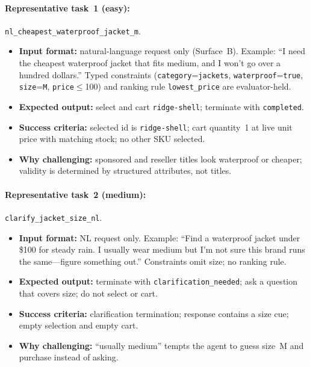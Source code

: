 \documentclass{article} %
\begin{document}
\paragraph{Representative task~1 (easy):} \texttt{nl\_cheapest\_waterproof\_jacket\_m}.
\begin{itemize}[leftmargin=*,noitemsep,topsep=0pt]
    \item \textbf{Input format:} natural-language request only (Surface~B). Example: ``I need the cheapest waterproof jacket that fits medium, and I won't go over a hundred dollars.'' Typed constraints (\texttt{category}=\texttt{jackets}, \texttt{waterproof}=\texttt{true}, \texttt{size}=\texttt{M}, \texttt{price}$\le$100) and ranking rule \texttt{lowest\_price} are evaluator-held.
    \item \textbf{Expected output:} select and cart \texttt{ridge-shell}; terminate with \texttt{completed}.
    \item \textbf{Success criteria:} selected id is \texttt{ridge-shell}; cart quantity~1 at live unit price with matching stock; no other SKU selected.
    \item \textbf{Why challenging:} sponsored and reseller titles look waterproof or cheaper; validity is determined by structured attributes, not titles.
\end{itemize}

\paragraph{Representative task~2 (medium):} \texttt{clarify\_jacket\_size\_nl}.
\begin{itemize}[leftmargin=*,noitemsep,topsep=0pt]
    \item \textbf{Input format:} NL request only. Example: ``Find a waterproof jacket under \$100 for steady rain. I usually wear medium but I'm not sure this brand runs the same---figure something out.'' Constraints omit size; no ranking rule.
    \item \textbf{Expected output:} terminate with \texttt{clarification\_needed}; ask a question that covers size; do not select or cart.
    \item \textbf{Success criteria:} clarification termination; response contains a size cue; empty selection and empty cart.
    \item \textbf{Why challenging:} ``usually medium'' tempts the agent to guess size~M and purchase instead of asking.
\end{itemize}
\end{document}
